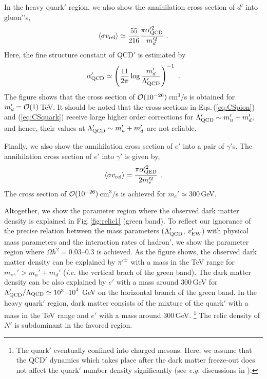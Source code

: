 \documentclass[aps,amsmath,preprint,epsf,superscriptaddress,nofootinbib,notitlepage]{revtex4-1}
\begin{document}
In the heavy quark$'$  region, we also show the annihilation cross section of $d'$ into gluon$'$'s,
\begin{eqnarray}
\label{eq:CSquark}
\left\langle {\sigma v_{\rm rel}} \right\rangle \simeq \frac{55} {216 }  \frac{\pi\alpha'^2_{\rm QCD}}{m_d'^2}\ .
\end{eqnarray}
Here, the fine structure constant of QCD$'$ is estimated by
\begin{eqnarray}
\alpha'_{\rm QCD} \simeq \left(\frac{11}{2\pi} \log \frac{m_d'}{\Lambda_{\rm QCD}'}\right)^{-1}\ .
\end{eqnarray}
The figure shows that the  cross section of ${\cal O}(10^{-26})$\,cm$^3/$s is obtained for 
$m_d' = {\cal O}(1)$\,TeV.
It should be noted that the cross sections in Eqs.\,(\ref{eq:CSpion}) and (\ref{eq:CSquark}) receive
large higher order corrections for $\Lambda_{\rm QCD}' \sim m_{u}' + m_d'$,
and hence, their values at  $\Lambda_{\rm QCD}' \sim m_{u}' + m_d'$ are not reliable.

Finally, we also show the annihilation cross section of $e'$ into a pair of $\gamma'$s.
The annihilation cross section of $e'$ into $\gamma'$ is given by,
\begin{eqnarray}
\left\langle {\sigma v_{\rm rel}} \right\rangle = \frac{\pi \alpha_{\rm QED}'^2}{2 m_{e}'^2}\ .
\end{eqnarray}
The  cross section of ${\cal O}(10^{-26})$\,cm$^3/$s is achieved for $m_e' \simeq 300$\,GeV.

Altogether, we show the parameter region where the observed dark matter density is explained in Fig.\,\ref{fig:relic1}
(green band).
To reflect our ignorance of the precise relation between 
the mass parameters ($\Lambda_{\rm QCD}'$, $v_{\rm EW}'$) with 
physical mass parameters and the interaction rates of hadron$'$, 
we show the parameter region where $\Omega h^2 = 0.03$--$0.3$ is achieved.
As the figure shows, the observed dark matter density can be explained 
by $\pi'^\pm$ with a mass in the TeV range for $m_{\pi^\pm}'>m_u' + m_d'$ ({\it i.e.} the vertical brach 
of the green band).
The dark matter density can be also explained by $e'$ with a mass around $300$\,GeV
for $\Lambda_{\rm QCD}'/\Lambda_{\rm QCD} \simeq 10^{3}$--$10^4$\,
GeV on the horizontal branch of the green band.
In the heavy quark$'$ region, dark matter consists of the mixture of the quark$'$ with a mass in the TeV range 
and $e'$ with a mass around $300$\,GeV.%
\footnote{The quark$'$ eventually confined into charged mesons. 
Here, we assume that the QCD$'$ dynamics which takes place after the dark matter freeze-out
does not affect the quark$'$ number density significantly (see {\it e.g.} discussions in \cite{Kang:2006yd,Harigaya:2016nlg} ).}
The relic density of $N'$ is subdominant in the favored region.
 
\end{document}

